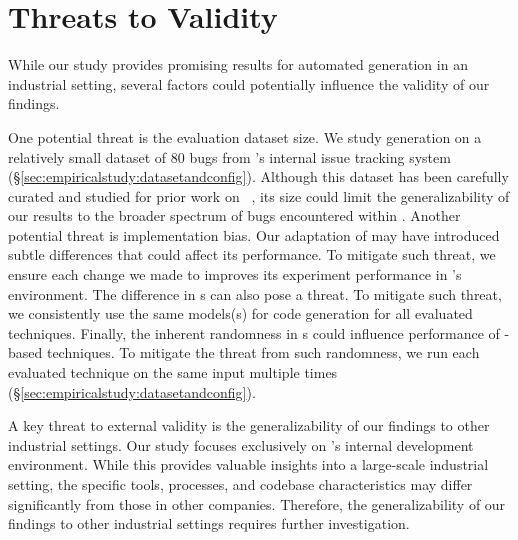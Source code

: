 \section{Threats to Validity}
\label{sec:threats}

While our study provides promising results for automated \brt generation in an industrial setting, several factors could potentially influence the validity of our findings.

One potential threat is the evaluation dataset size.
We study \brt generation on a relatively small dataset of 80 bugs from \google's internal issue tracking system (\S\ref{sec:empiricalstudy:datasetandconfig}). 
Although this dataset has been carefully curated and studied for prior work on \autopr~\cite{rondon2025passerine}, its size could limit the generalizability of our results to the broader spectrum of bugs encountered within \google.
Another potential threat is implementation bias. 
Our adaptation of \libro may have introduced subtle differences that could affect its performance.
To mitigate such threat, we ensure each change we made to \libro improves its experiment performance in \google's environment. 
The difference in \llm{}s can also pose a threat.
To mitigate such threat, we consistently use the same \gemini models(s) for code generation for all evaluated techniques.
Finally, the inherent randomness in \llm{}s could influence performance of \llm-based techniques. 
To mitigate the threat from such randomness, we run each evaluated technique on the same input multiple times (\S\ref{sec:empiricalstudy:datasetandconfig}).

A key threat to external validity is the generalizability of our findings to other industrial settings. 
Our study focuses exclusively on \google's internal development environment. 
While this provides valuable insights into a large-scale industrial setting, the specific tools, processes, and codebase characteristics may differ significantly from those in other companies. 
Therefore, the generalizability of our findings to other industrial settings requires further investigation.

